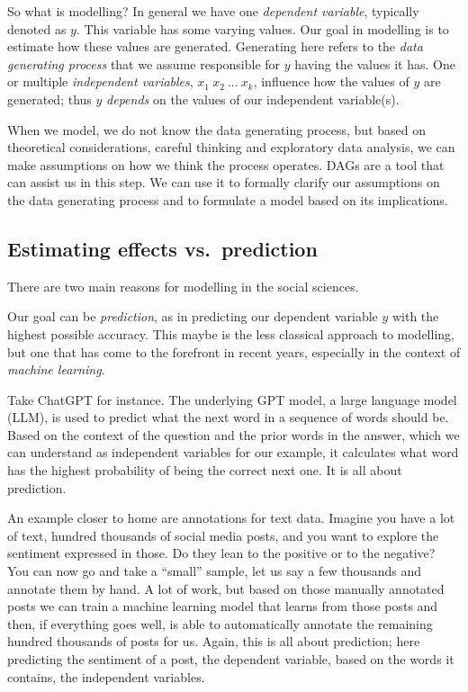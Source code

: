 \documentclass[
]{book}
\begin{document}
So what is modelling? In general we have one \emph{dependent variable},
typically denoted as \(y\). This variable has some varying values. Our
goal in modelling is to estimate how these values are generated.
Generating here refers to the \emph{data generating process} that we assume
responsible for \(y\) having the values it has. One or multiple
\emph{independent variables}, \(x_1 \ x_2 \ ... \ x_k\), influence how the
values of \(y\) are generated; thus \(y\) \emph{depends} on the values of our
independent variable(s).

When we model, we do not know the data generating process, but based on
theoretical considerations, careful thinking and exploratory data
analysis, we can make assumptions on how we think the process operates.
DAGs are a tool that can assist us in this step. We can use it to
formally clarify our assumptions on the data generating process and to
formulate a model based on its implications.

\hypertarget{estimating-effects-vs.-prediction}{%
\subsection{Estimating effects vs.~prediction}\label{estimating-effects-vs.-prediction}}

There are two main reasons for modelling in the social sciences.

Our goal can be \emph{prediction}, as in predicting our dependent variable
\(y\) with the highest possible accuracy. This maybe is the less classical
approach to modelling, but one that has come to the forefront in recent
years, especially in the context of \emph{machine learning}.

Take ChatGPT for instance. The underlying GPT model, a large language
model (LLM), is used to predict what the next word in a sequence of
words should be. Based on the context of the question and the prior
words in the answer, which we can understand as independent variables
for our example, it calculates what word has the highest probability of
being the correct next one. It is all about prediction.

An example closer to home are annotations for text data. Imagine you
have a lot of text, hundred thousands of social media posts, and you
want to explore the sentiment expressed in those. Do they lean to the
positive or to the negative? You can now go and take a ``small'' sample,
let us say a few thousands and annotate them by hand. A lot of work, but
based on those manually annotated posts we can train a machine learning
model that learns from those posts and then, if everything goes well, is
able to automatically annotate the remaining hundred thousands of posts
for us. Again, this is all about prediction; here predicting the
sentiment of a post, the dependent variable, based on the words it
contains, the independent variables.
\end{document}
